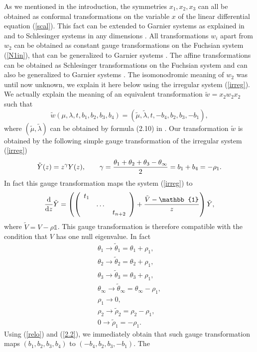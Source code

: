 \documentclass[12pt]{article}
\newcommand{\ID}{\mathbb{1}}
\theoremstyle{definition}
\theoremstyle{theorem}
\begin{document}
As we mentioned in the introduction, the symmetries $x_1,x_2,x_3$ can all 
be obtained as conformal transformations on the variable $x$ of the linear 
differential equation (\ref{scal}). This fact can be extended to Garnier 
systems as explained in \cite{IKSY} and to Schlesinger systems in any 
dimensions \cite{DM1}. All transformations $w_i$ apart from 
$w_2$ can be obtained as constant gauge transformations on the 
Fuchsian system (\ref{N1in}), that can be generalized to Garnier systems 
\cite{Ts}. The affine transformations can be obtained 
as Schlesinger transformations on the Fuchsian system and can also be 
generalized to Garnier systems \cite{Ts}. The isomonodromic meaning of $w_2$
was until now unknown, we explain it here below using the irregular system 
(\ref{irreg}). We actually explain the meaning of an equivalent 
transformation $\tilde w=x_2 w_2 x_2$ such that 
$$
\tilde w(\mu,\lambda,t,b_1,b_2,b_3,b_4) = 
(\tilde\mu,\tilde\lambda,t,-b_4,b_2,b_3,-b_1),
$$
where $(\tilde\mu,\tilde\lambda)$ can be obtained by formula (2.10) in 
\cite{Ok2}. Our transformation $\tilde w$ is obtained by the following 
simple gauge transformation of the irregular system (\ref{irreg})
$$
\tilde Y(z)=z^\gamma Y(z),\qquad 
\gamma={\theta_1+\theta_2+\theta_3-\theta_\infty\over2}=b_1+b_4= 
-\rho_1. 
$$
In fact this gauge transformation maps the system (\ref{irreg}) to
$$
{{\rm d}\over{\rm d}z}\tilde Y
=\left(\left(\begin{array}{ccc}t_1& & \\ & \dots&\\ & & t_{n+2}
\end{array}\right)+{\tilde V-\ID\over z}\right) \tilde Y,
$$
where $\tilde V=V-\rho\ID$. This gauge transformation is therefore compatible 
with the condition that $V$ has one null eigenvalue. In fact 
$$
\begin{array}{l}
\theta_1\to\tilde\theta_1=\theta_1+\rho_1,\\
\theta_2\to\tilde\theta_2=\theta_2+\rho_1,\\
\theta_3\to\tilde\theta_3=\theta_3+\rho_1,\\
\theta_\infty\to\tilde\theta_\infty=\theta_\infty-\rho_1,\\
\rho_1\to 0,\\
\rho_2\to\tilde\rho_2=\rho_2-\rho_1,\\
0\to\tilde\rho_1=-\rho_1.
\end{array}
$$
Using (\ref{relo}) and (\ref{2.2}), we immediately obtain that such gauge 
transformation maps $(b_1,b_2,b_3,b_4)$ to $(-b_4,b_2,b_3,-b_1)$. The
\end{document}
